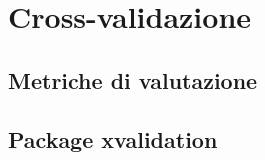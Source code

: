 \section{Cross-validazione}\label{subsec:rctbn-cross-validation}
\omissis{}

\subsection{Metriche di valutazione}\label{subsec:rctbn-metrics}
\omissis{}


\subsection{Package xvalidation}\label{subsec:rctbn-xvalidation}
\omissis{}

